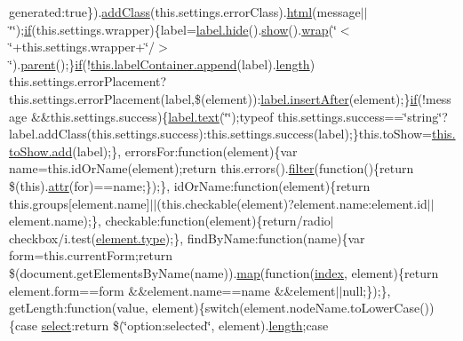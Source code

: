 \begin{DoxyCompactItemize}
generated\+:true\}).\hyperlink{jquery-1_810_82-vsdoc_8js_ac98f6924e42def59f1eb8d3ea1892a8e}{add\+Class}(this.\+settings.\+error\+Class).\hyperlink{jquery-1_810_82-vsdoc_8js_a54a716632718016dd4e400e83a0970e2}{html}(message$\vert$$\vert$\char`\"{}\char`\"{});\hyperlink{packages_2_respond_81_82_80_2content_2_scripts_2respond_8min_8js_a93851d60dd037a83509a1757b9ee7b66}{if}(this.\+settings.\+wrapper)\{label=\hyperlink{jquery-1_810_82-vsdoc_8js_ab184a969b4c8542290dae744d90fd4d2}{label.\+hide}().\hyperlink{jquery-1_810_82-vsdoc_8js_a8dcdb81268297f0ecf76be5e6aebd05c}{show}().\hyperlink{jquery-1_810_82-vsdoc_8js_a75991b1c3d71522ced1bf65ab3b07902}{wrap}(\char`\"{}$<$\char`\"{}+this.\+settings.\+wrapper+\char`\"{}/$>$\char`\"{}).\hyperlink{jquery-1_810_82-vsdoc_8js_aed9b5e7a755bcccb282f9b06c00a6822}{parent}();\}\hyperlink{packages_2_respond_81_82_80_2content_2_scripts_2respond_8min_8js_a93851d60dd037a83509a1757b9ee7b66}{if}(!\hyperlink{jquery-1_810_82-vsdoc_8js_a6b9ad5e0cf5c7480e9a327c771349a90}{this.\+label\+Container.\+append}(label).\hyperlink{jquery-1_810_82-vsdoc_8js_aa7de35d58da66d9944ab9cbe82c19640}{length}) this.\+settings.\+error\+Placement?this.\+settings.\+error\+Placement(label,\$(element))\+:\hyperlink{jquery-1_810_82-vsdoc_8js_a6337c8bc3e44ee2285abf58492aed7f2}{label.\+insert\+After}(element);\}\hyperlink{packages_2_respond_81_82_80_2content_2_scripts_2respond_8min_8js_a93851d60dd037a83509a1757b9ee7b66}{if}(!message \&\&this.\+settings.\+success)\{\hyperlink{jquery-1_810_82-vsdoc_8js_aa5b77da29631a344064bb3d20c8702de}{label.\+text}(\char`\"{}\char`\"{});typeof this.\+settings.\+success==\char`\"{}string\char`\"{}?label.\+add\+Class(this.\+settings.\+success)\+:this.\+settings.\+success(label);\}this.\+to\+Show=\hyperlink{jquery-1_810_82-vsdoc_8js_a2f34e089948aad779d5a43c9b381caa6}{this.\+to\+Show.\+add}(label);\}, errors\+For\+:function(element)\{var name=this.\+id\+Or\+Name(element);return this.\+errors().\hyperlink{jquery-1_810_82-vsdoc_8js_ac99d0cf56cab46114f5765a14e03ad6d}{filter}(function()\{return \$(this).\hyperlink{jquery-1_810_82-vsdoc_8js_aa76c97588b348e5c1975810431456d90}{attr}(\textquotesingle{}for\textquotesingle{})==name;\});\}, id\+Or\+Name\+:function(element)\{return this.\+groups\mbox{[}element.\+name\mbox{]}$\vert$$\vert$(this.\+checkable(element)?element.\+name\+:element.\+id$\vert$$\vert$element.\+name);\}, checkable\+:function(element)\{return/radio$\vert$checkbox/i.\+test(\hyperlink{jquery-1_810_82-vsdoc_8js_a3940565e83a9bfd10d95ffd27536da91}{element.\+type});\}, find\+By\+Name\+:function(name)\{var form=this.\+current\+Form;return \$(document.\+get\+Elements\+By\+Name(name)).\hyperlink{jquery-1_810_82-vsdoc_8js_a20838f8c4bedc779e51bf830f5a4d471}{map}(function(\hyperlink{jquery-1_810_82-vsdoc_8js_a75bb12d1f23302a9eea93a6d89d0193e}{index}, element)\{return element.\+form==form \&\&element.\+name==name \&\&element$\vert$$\vert$null;\});\}, get\+Length\+:function(value, element)\{switch(element.\+node\+Name.\+to\+Lower\+Case())\{case \textquotesingle{}\hyperlink{jquery-1_810_82-vsdoc_8js_a861f73402c6bb8457b04e4c36686ce8c}{select}\textquotesingle{}\+:return \$(\char`\"{}option\+:selected\char`\"{}, element).\hyperlink{jquery-1_810_82-vsdoc_8js_aa7de35d58da66d9944ab9cbe82c19640}{length};case 
\end{DoxyCompactItemize}
